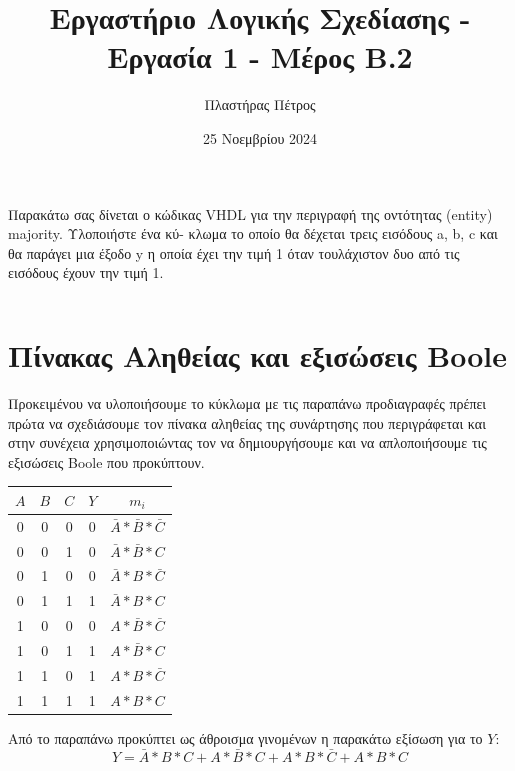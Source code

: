 \documentclass[]{article}
\begin{document}
\author{Πλαστήρας Πέτρος}
\title{Εργαστήριο Λογικής Σχεδίασης - Εργασία 1 - Μέρος Β.2}
\date{25 Νοεμβρίου 2024}
\maketitle

Παρακάτω σας δίνεται ο κώδικας VHDL για την περιγραφή της οντότητας (entity) majority. Υλοποιήστε ένα κύ-
κλωμα το οποίο θα δέχεται τρεις εισόδους a, b, c και θα παράγει μια έξοδο y η οποία έχει την τιμή 1 όταν τουλάχιστον δυο από τις εισόδους έχουν την τιμή 1.
\inputminted{vhdl}{majority.vhdl}

\section{Πίνακας Αληθείας και εξισώσεις Boole}
Προκειμένου να υλοποιήσουμε το κύκλωμα με τις παραπάνω προδιαγραφές πρέπει πρώτα να
σχεδιάσουμε τον πίνακα αληθείας της συνάρτησης που περιγράφεται και στην συνέχεια
χρησιμοποιώντας τον να δημιουργήσουμε και να απλοποιήσουμε τις εξισώσεις Boole που προκύπτουν.
\begin{center}
	\begin{tabular}{ | c | c | c | c | c | }
		\hline $A$                & $B$ & $C$ & $Y$ & $m_i$                         \\
		\hline \rule{0pt}{11pt} 0 & 0   & 0   & 0   & $\bar{A} * \bar{B} * \bar{C}$ \\
		\rule{0pt}{11pt} 0        & 0   & 1   & 0   & $\bar{A} * \bar{B} * C$       \\
		\rule{0pt}{11pt} 0        & 1   & 0   & 0   & $\bar{A} * B * \bar{C}$       \\
		\rule{0pt}{11pt} 0        & 1   & 1   & 1   & $\bar{A} * B * C$             \\
		\rule{0pt}{11pt} 1        & 0   & 0   & 0   & $A * \bar{B} * \bar{C}$       \\
		\rule{0pt}{11pt} 1        & 0   & 1   & 1   & $A * \bar{B} * C$             \\
		\rule{0pt}{11pt} 1        & 1   & 0   & 1   & $A * B * \bar{C}$             \\
		\rule{0pt}{11pt} 1        & 1   & 1   & 1   & $A * B * C$                   \\
		\hline
	\end{tabular}
\end{center}

Από το παραπάνω προκύπτει ως άθροισμα γινομένων η παρακάτω εξίσωση για το $Y$:
$$Y = \bar{A} * B * C + A * \bar{B} * C + A * B * \bar{C} + A * B * C$$
\end{document}
